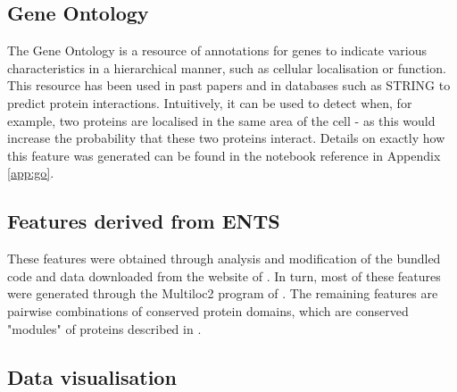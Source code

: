 \subsection{Gene Ontology}
\label{go}

The Gene Ontology\autocite{ashburner_gene_2000} is a resource of annotations for genes to indicate various characteristics in a hierarchical manner, such as cellular localisation or function.
This resource has been used in past papers\autocite{qi_evaluation_2006} and in databases such as STRING\autocite{von_mering_string:_2005} to predict protein interactions.
Intuitively, it can be used to detect when, for example, two proteins are localised in the same area of the cell - as this would increase the probability that these two proteins interact.
Details on exactly how this feature was generated can be found in the notebook reference in Appendix \ref{app:go}.

\subsection{Features derived from ENTS}
\label{ents}

These features were obtained through analysis and modification of the bundled code and data downloaded from the website of \textcite{rodgers-melnick_predicting_2013}.
In turn, most of these features were generated through the Multiloc2 program of \textcite{blum_multiloc2:_2009}.
The remaining features are pairwise combinations of conserved protein domains, which are conserved "modules" of proteins described in \textcite{janin_domains_1985}.





\subsection{Data visualisation}
\label{dataviz}

